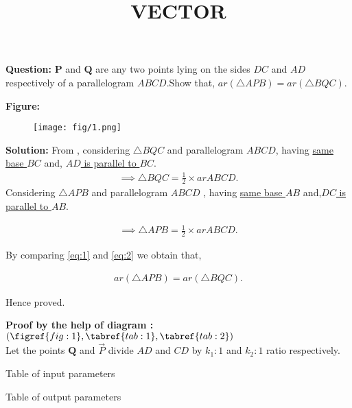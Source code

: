 \documentclass[12pt]{article}
\let\vec\mathbf
\providecommand{\brak}[1]{\ensuremath{\left(#1\right)}}
\begin{document}
\title{\textbf{VECTOR}}
\date{}
\maketitle
\textbf{Question:} $\vec{P}$ and $\vec{Q}$ are any two points lying on the sides $DC$ and $AD$ respectively of a parallelogram $ABCD$.Show that, $ar\brak{\triangle APB}=ar\brak{\triangle BQC}$.


\textbf{Figure:}
\begin{figure}[H]
    \centering
   \texttt{[image: fig/1.png]}
    \caption{}
    \label{fig:fig:1}
\end{figure}


\textbf{Solution:}
From  ,
considering $\triangle BQC$ and parallelogram $ ABCD$, having \underline{same base $BC$} and, \underline{$AD$ is parallel to $BC$}.\\
\begin{align}
\implies \triangle BQC = \frac{1}{2}\times ar ABCD.
  \label{eq:eq:1}
\end{align}
Considering $\triangle APB$ and parallelogram $ABCD$ , having \underline{same base $AB$} and,\underline{$DC$ is parallel to $AB$}.

\begin{align}
\implies \triangle APB = \frac{1}{2}\times ar ABCD.
\label{eq:eq:2}
\end{align}

By comparing \eqref{eq:1} and \eqref{eq:2} we obtain that,

\begin{align}
    ar\brak{\triangle APB} =  ar\brak{\triangle BQC}.
\end{align}
\begin{center}
 Hence proved.

\end{center}

\textbf{Proof by the help of diagram :}\brak{\figref{fig:1},\tabref{tab:1},\tabref{tab:2}}\\
Let the points $\vec{Q}$ and $\Vec{P}$ divide $AD$ and $CD$ by $k_1:1$ and $k_2:1$ ratio respectively.
\begin{table}[H]
   \centering
   
   \caption{Table of input parameters}
   \label{tab:tab:1}
\end{table}




\begin{table}[H]
    \centering                                      
                              
    \caption{Table of output parameters}
	\label{tab:tab:2}
 \end{table}
\end{document}
